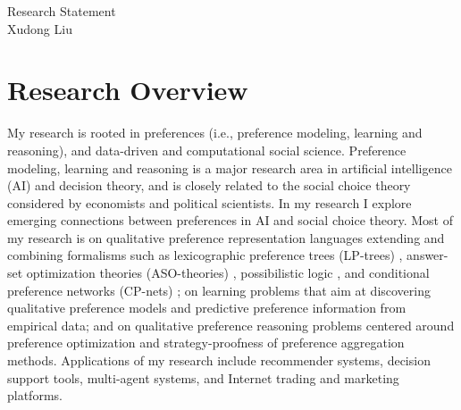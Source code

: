 \documentclass[11pt]{article}
\begin{document}
%

\begingroup  
  \centering
  \huge Research Statement\\[0.25em]
  \large Xudong Liu\par
\endgroup


\section{Research Overview}
\noindent My research is rooted in preferences (i.e., 
preference modeling, learning and reasoning),
and data-driven and computational social science.
Preference modeling, learning and reasoning is a major research 
area in artificial intelligence (AI) and decision theory, and is closely related to the 
social choice theory considered by economists and political scientists. In my research I 
explore emerging connections between preferences in AI and social choice theory. 
Most of my research is on qualitative preference representation languages extending and combining
formalisms such as  
lexicographic preference trees (LP-trees) \cite{booth:learningLP}, 
answer-set optimization theories (ASO-theories) \cite{Brewka:ASO}, 
possibilistic logic \cite{dubois1991towards}, and 
conditional preference networks (CP-nets) \cite{boutilier2004cp};
on learning problems that aim at discovering qualitative preference 
models and predictive preference information from empirical data; and on
qualitative preference reasoning problems centered around preference optimization 
and strategy-proofness of preference aggregation methods.
Applications of my research include recommender systems, decision support tools,
multi-agent systems, and Internet trading and marketing platforms.
\end{document}
